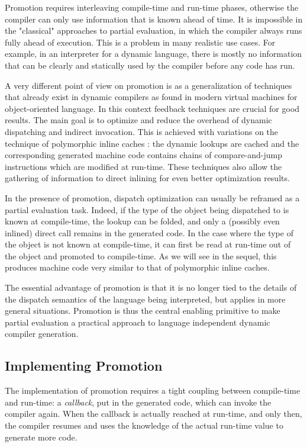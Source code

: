 Promotion requires interleaving compile-time and run-time phases,
otherwise the compiler can only use information that is known ahead of
time. It is impossible in the "classical" approaches to partial
evaluation, in which the compiler always runs fully ahead of execution.
This is a problem in many realistic use cases.  For example, in an
interpreter for a dynamic language, there is mostly no information
that can be clearly and statically used by the compiler before any
code has run.

A very different point of view on promotion is as a generalization of techniques
that already exist in dynamic compilers as found in modern virtual machines for
object-oriented language.  In this context feedback
techniques are crucial for good results.  The main goal is to
optimize and reduce the overhead of dynamic dispatching and indirect
invocation.  This is achieved with variations on the technique of
polymorphic inline caches \cite{hoelzle_optimizing_1991}: the dynamic lookups are cached and
the corresponding generated machine code contains chains of
compare-and-jump instructions which are modified at run-time.  These
techniques also allow the gathering of information to direct inlining for even
better optimization results.

In the presence of promotion, dispatch optimization can usually be
reframed as a partial evaluation task.  Indeed, if the type of the
object being dispatched to is known at compile-time, the lookup can be
folded, and only a (possibly even inlined) direct call remains in the
generated code.  In the case where the type of the object is not known
at compile-time, it can first be read at run-time out of the object and
promoted to compile-time.  As we will see in the sequel, this produces
machine code very similar to that of polymorphic inline
caches.

The essential advantage of promotion is that it is no longer tied to the details of
the dispatch semantics of the language being interpreted, but applies in
more general situations.  Promotion is thus the central enabling
primitive to make partial evaluation a practical approach to language
independent dynamic compiler generation.

\subsection{Implementing Promotion}

The implementation of promotion requires a tight coupling between
compile-time and run-time: a \emph{callback}, put in the generated code,
which can invoke the compiler again.  When the callback is actually
reached at run-time, and only then, the compiler resumes and uses the
knowledge of the actual run-time value to generate more code.

